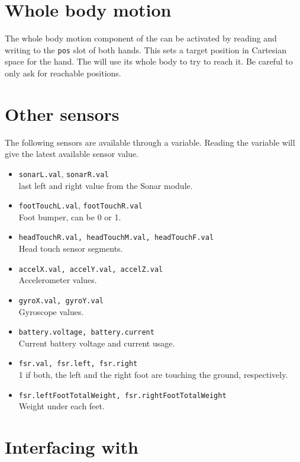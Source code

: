 \section{Whole body motion}

The whole body motion component of the \naoqi can be activated by reading
and writing to the \lstinline|pos| slot of both hands. This sets a target
position in Cartesian space for the hand. The \naoqi will use its whole body
to try to reach it. Be careful to only ask for reachable positions.

\section{Other sensors}

The following sensors are available through a \us variable.  Reading the
variable will give the latest available sensor value.

\begin{itemize}
\item \lstinline|sonarL.val|, \lstinline|sonarR.val| \\
    last left and right value from the Sonar module.
\item \lstinline|footTouchL.val|, \lstinline|footTouchR.val| \\
    Foot bumper, can be 0 or 1.
\item \lstinline|headTouchR.val, headTouchM.val, headTouchF.val| \\
    Head touch sensor segments.
\item \lstinline|accelX.val, accelY.val, accelZ.val| \\
    Accelerometer values.
\item \lstinline|gyroX.val, gyroY.val| \\
    Gyroscope values.
\item \lstinline|battery.voltage, battery.current| \\
    Current battery voltage and current usage.
  \item \lstinline|fsr.val, fsr.left, fsr.right| \\
    1 if both, the left and the right foot are touching the ground,
    respectively.
\item \lstinline|fsr.leftFootTotalWeight, fsr.rightFootTotalWeight| \\
    Weight under each feet.
\end{itemize}

\section{Interfacing with \naoqi}


